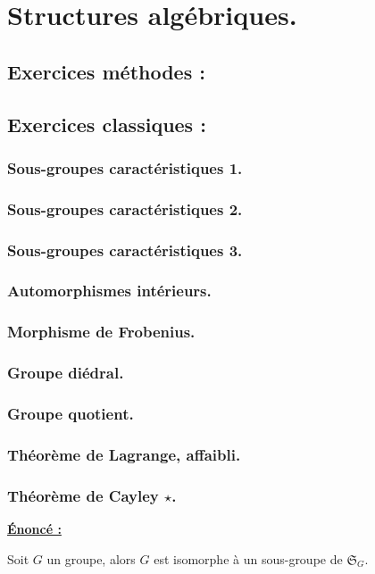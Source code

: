 \section{Structures algébriques.}
\subsection{Exercices méthodes :}

\subsection{Exercices classiques :}
\subsubsection{Sous-groupes caractéristiques 1.}
\subsubsection{Sous-groupes caractéristiques 2.}
\subsubsection{Sous-groupes caractéristiques 3.}
\subsubsection{Automorphismes intérieurs.}
\subsubsection{Morphisme de Frobenius.}
\subsubsection{Groupe diédral.}
\subsubsection{Groupe quotient.}
\subsubsection{Théorème de Lagrange, affaibli.}
\subsubsection{Théorème de Cayley $\star$.}
\textbf{\underline{Énoncé : }}

Soit $G$ un groupe, alors $G$ est isomorphe à un sous-groupe de 
$\mathfrak{S}_G$.


